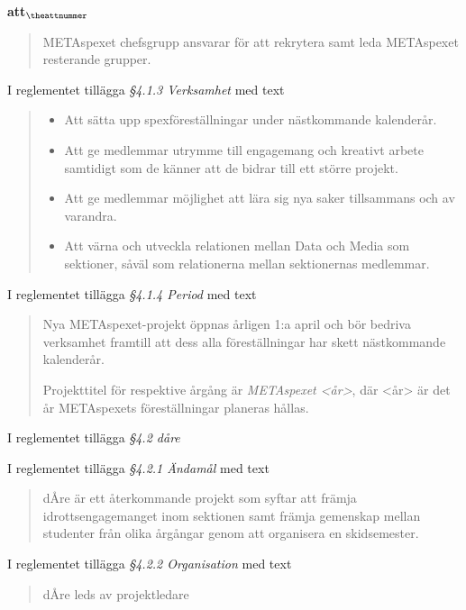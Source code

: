 \documentclass[a4paper]{article}
\begin{document}
\begin{list}{\bf att$_{\theattnummer}$}{}
\begin{quote}
        METAspexet chefsgrupp ansvarar för att rekrytera samt leda METAspexet resterande grupper.
    \end{quote}
\item I reglementet tillägga \textit{\S4.1.3 Verksamhet} med text
    \begin{quote}
        \begin{itemize}
            \item Att sätta upp spexföreställningar under nästkommande kalenderår.
            \item Att ge medlemmar utrymme till engagemang och kreativt arbete samtidigt som de känner att de bidrar till ett större projekt.
            \item Att ge medlemmar möjlighet att lära sig nya saker tillsammans och av varandra.
            \item Att värna och utveckla relationen mellan Data och Media som sektioner, såväl som relationerna mellan sektionernas medlemmar.
        \end{itemize}
    \end{quote}
\item I reglementet tillägga \textit{\S4.1.4 Period} med text
    \begin{quote} Nya METAspexet-projekt öppnas årligen 1:a april och bör bedriva verksamhet framtill att dess alla föreställningar har skett nästkommande kalenderår.

    Projekttitel för respektive årgång är \textit{METAspexet <år>}, där <år> är det år METAspexets föreställningar planeras hållas.
    \end{quote}


\item I reglementet tillägga \textit{\S4.2 dåre}
\item I reglementet tillägga \textit{\S4.2.1 Ändamål} med text
    \begin{quote}
        dÅre är ett återkommande projekt som syftar att främja idrottsengagemanget inom sektionen samt främja gemenskap mellan studenter från olika årgångar genom att organisera en skidsemester.
    \end{quote}
\item I reglementet tillägga \textit{\S4.2.2 Organisation} med text
    \begin{quote}
        dÅre leds av projektledare


\end{quote}
\end{list}
\end{document}

